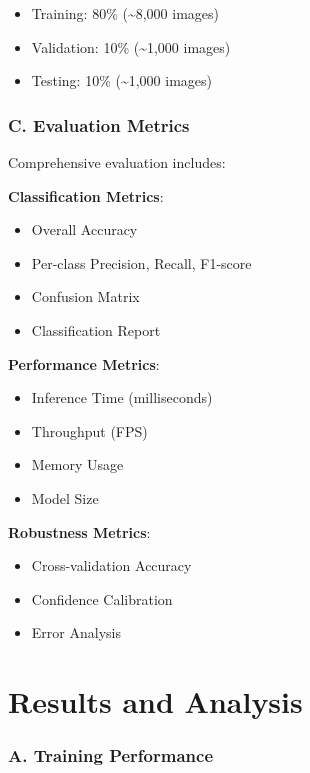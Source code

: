 \documentclass[11pt,a4paper,twoside]{article}
\providecommand{\tightlist}{%
  \setlength{\itemsep}{0pt}\setlength{\parskip}{0pt}}
\begin{document}
\begin{itemize}
\tightlist
\item
  Training: 80\% (\textasciitilde8,000 images)
\item
  Validation: 10\% (\textasciitilde1,000 images)
\item
  Testing: 10\% (\textasciitilde1,000 images)
\end{itemize}

\subsubsection{C. Evaluation Metrics}\label{c.-evaluation-metrics}

Comprehensive evaluation includes:

\textbf{Classification Metrics}:

\begin{itemize}
\tightlist
\item
  Overall Accuracy
\item
  Per-class Precision, Recall, F1-score
\item
  Confusion Matrix
\item
  Classification Report
\end{itemize}

\textbf{Performance Metrics}:

\begin{itemize}
\tightlist
\item
  Inference Time (milliseconds)
\item
  Throughput (FPS)
\item
  Memory Usage
\item
  Model Size
\end{itemize}

\textbf{Robustness Metrics}:

\begin{itemize}
\tightlist
\item
  Cross-validation Accuracy
\item
  Confidence Calibration
\item
  Error Analysis
\end{itemize}

\section{Results and Analysis}\label{v.-results-and-analysis}

\subsubsection{A. Training Performance}\label{a.-training-performance}
\end{document}
